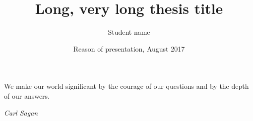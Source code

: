 \documentclass[8pt,xcolor={dvipsnames,table,xcdraw},handout]{beamer} %
\title[Short thesis title]{Long, very long thesis title}
\author[ITL Cinvestav-Tamaulipas]{Student name}
\institute[
  ITL Information Technology Laboratory\\
  Cinvestav\\
  Tamaulipas
] 
{Advisor 1\\Advisor 2\\ITL Cinvestav}
\date{Reason of presentation, August 2017}
\begin{document}
{\aauwavesbg%
\begin{frame} %
  \titlepage
\end{frame}}





{\aauwavesbg
\begin{frame}[plain]
  { \tiny
    \epigraph{\tiny We make our world significant by the courage of our questions and by the depth of our answers.}{\tiny \textit{Carl Sagan}}
  }
\end{frame}}


\end{document}
